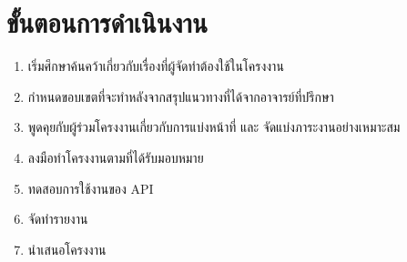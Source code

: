 \section{ขั้นตอนการดำเนินงาน}
\begin{enumerate}
    \item เริ่มศึกษาค้นคว้าเกี่ยวกับเรื่องที่ผู้จัดทำต้องใช้ในโครงงาน
    \item กำหนดขอบเขตที่จะทำหลังจากสรุปแนวทางที่ได้จากอาจารย์ที่ปรึกษา
    \item พูดคุยกับผู้ร่วมโครงงานเกี่ยวกับการแบ่งหน้าที่ และ จัดแบ่งภาระงานอย่างเหมาะสม
    \item ลงมือทำโครงงานตามที่ได้รับมอบหมาย
    \item ทดสอบการใช้งานของ API
    \item จัดทำรายงาน
    \item นำเสนอโครงงาน
\end{enumerate}

